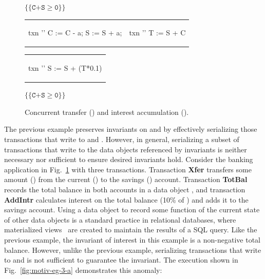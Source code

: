 \begin{figure}[t]
\centering
$\{\{\texttt{C+S}\ge\texttt{0}\}\}$
\begin{tabular}{l||l||}
\begin{txnimpcode}
  txn '\B{Xfer}' {
    C := C - a;
    S := S + a;
  }
\end{txnimpcode}
&
\begin{txnimpcode}
  txn '\B{TotBal}' {
    T := S + C
  }
\end{txnimpcode}
\end{tabular}
\begin{tabular}{c}
  \begin{txnimpcode}
    txn '\B{AddInt}' {
      S := S + (T*0.1)
    }
  \end{txnimpcode}
\end{tabular}

$\{\{\texttt{C+S}\ge\texttt{0}\}\}$

\caption{Concurrent transfer () and interest accumulation ().}
\label{fig:motiv-eg-3}
\end{figure}

The previous example preserves invariants on  and  by
effectively serializing those transactions that write to  and
.  However, in general, serializing a subset of transactions that
write to the data objects referenced by invariants is neither
necessary nor sufficient to ensure desired invariants hold. Consider
the banking application in Fig.~\ref{fig:motiv-eg-3} with three
transactions. Transaction {\bf Xfer} transfers some amount ()
from the current () to the savings () account.  Transaction
{\bf TotBal} records the total balance in both accounts in a data
object , and transaction {\bf AddIntr} calculates interest on the
total balance (10\% of ) and adds it to the savings
account. Using a data object to record some function of the current
state of other data objects is a standard practice in relational
databases, where materialized views~\cite{oraclematview} are created
to maintain the results of a SQL query. Like the previous example, the
invariant of interest in this example is a non-negative total balance.
However, unlike the previous example, serializing transactions that
write to  and  is not sufficient to guarantee the invariant.
The execution shown in Fig.~\ref{fig:motiv-eg-3-a} demonstrates this anomaly:

